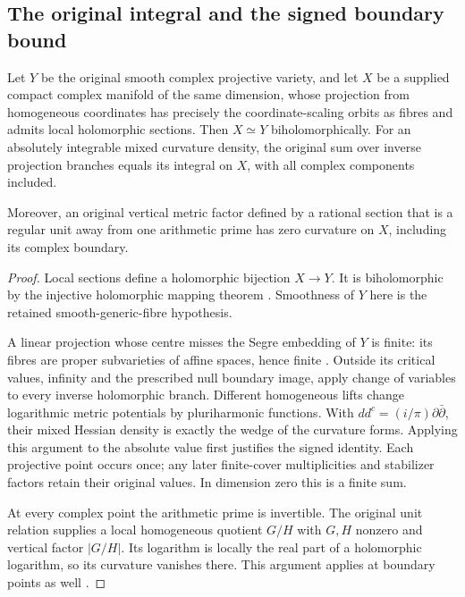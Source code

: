 \subsection{The original integral and the signed boundary bound}
\label{sec:compact-model-signed-stokes}

\begin{lemma}\label{lem:compact-model-integral}
Let $Y$ be the original smooth complex projective variety, and let
$X$ be a supplied compact complex manifold of the same dimension,
whose projection from homogeneous coordinates has precisely the
coordinate-scaling orbits as fibres and admits local holomorphic
sections. Then $X\simeq Y$ biholomorphically. For an absolutely
integrable mixed curvature density, the original sum over inverse
projection branches equals its integral on $X$, with all complex
components included.

Moreover, an original vertical metric factor defined by a rational
section that is a regular unit away from one arithmetic prime has
zero curvature on $X$, including its complex boundary.
\end{lemma}

\begin{proof}
Local sections define a holomorphic bijection $X\to Y$. It is
biholomorphic by the injective holomorphic mapping theorem
\cite[Theorem~1.6.6]{compact-stokes-lebl}. Smoothness of $Y$ here is
the retained smooth-generic-fibre hypothesis.

A linear projection whose centre misses the Segre embedding of $Y$
is finite: its fibres are proper subvarieties of affine spaces,
hence finite \cite{compact-stokes-projection}. Outside its critical
values, infinity and the prescribed null boundary image, apply
change of variables to every inverse holomorphic branch. Different
homogeneous lifts change logarithmic metric potentials by
pluriharmonic functions. With $dd^c=(i/\pi)\partial\bar\partial$,
their mixed Hessian density is exactly the wedge of the curvature
forms. Applying this argument to the absolute value first justifies
the signed identity. Each projective point occurs once; any later
finite-cover multiplicities and stabilizer factors retain their
original values. In dimension zero this is a finite sum.

At every complex point the arithmetic prime is invertible. The
original unit relation supplies a local homogeneous quotient $G/H$
with $G,H$ nonzero and vertical factor $|G/H|$. Its logarithm is
locally the real part of a holomorphic logarithm, so its curvature
vanishes there. This argument applies at boundary points as well
\cite{compact-stokes-source}.
\end{proof}

